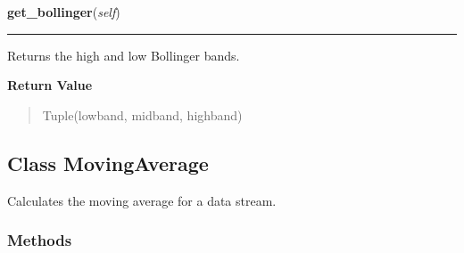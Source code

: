\hspace{.8\funcindent}\begin{boxedminipage}{\funcwidth}

    \raggedright \textbf{get\_bollinger}(\textit{self})

    \vspace{-1.5ex}

    \rule{\textwidth}{0.5\fboxrule}
\setlength{\parskip}{2ex}
    Returns the high and low Bollinger bands.

\setlength{\parskip}{1ex}
      \textbf{Return Value}
    \vspace{-1ex}

      \begin{quote}
      Tuple(lowband, midband, highband)

      \end{quote}

    \end{boxedminipage}



\subsection{Class MovingAverage}

    \label{nukaquant:MovingAverage}
Calculates the moving average for a data stream.



  \subsubsection{Methods}

    \label{nukaquant:MovingAverage:__init__}

    \vspace{0.5ex}

